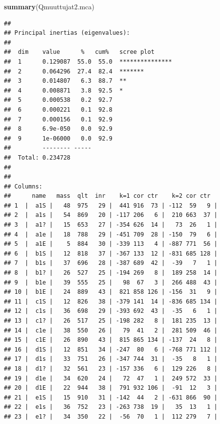 \documentclass[
  finnish,
]{book}
\newenvironment{Shaded}{\begin{snugshade}}{\end{snugshade}}
\newcommand{\KeywordTok}[1]{\textcolor[rgb]{0.13,0.29,0.53}{\textbf{#1}}}
\newcommand{\NormalTok}[1]{#1}
\begin{document}
\begin{Shaded}
\begin{Highlighting}[]
\KeywordTok{summary}\NormalTok{(Qmuuttujat2.mca)}
\end{Highlighting}
\end{Shaded}

\begin{verbatim}
## 
## Principal inertias (eigenvalues):
## 
##  dim    value      %   cum%   scree plot               
##  1      0.129087  55.0  55.0  ***************          
##  2      0.064296  27.4  82.4  *******                  
##  3      0.014807   6.3  88.7  **                       
##  4      0.008871   3.8  92.5  *                        
##  5      0.000538   0.2  92.7                           
##  6      0.000221   0.1  92.8                           
##  7      0.000156   0.1  92.9                           
##  8      6.9e-050   0.0  92.9                           
##  9      1e-06000   0.0  92.9                           
##         -------- -----                                 
##  Total: 0.234728                                       
## 
## 
## Columns:
##      name   mass  qlt  inr    k=1 cor ctr    k=2 cor ctr  
## 1  |  a1S |   48  975   29 |  441 916  73 | -112  59   9 |
## 2  |  a1s |   54  869   20 | -117 206   6 |  210 663  37 |
## 3  |  a1? |   15  653   27 | -354 626  14 |   73  26   1 |
## 4  |  a1e |   18  788   29 | -451 709  28 | -150  79   6 |
## 5  |  a1E |    5  884   30 | -339 113   4 | -887 771  56 |
## 6  |  b1S |   12  818   37 | -367 133  12 | -831 685 128 |
## 7  |  b1s |   37  696   28 | -387 689  42 |  -39   7   1 |
## 8  |  b1? |   26  527   25 | -194 269   8 |  189 258  14 |
## 9  |  b1e |   39  555   25 |   98  67   3 |  266 488  43 |
## 10 |  b1E |   24  889   43 |  821 858 126 | -156  31   9 |
## 11 |  c1S |   12  826   38 | -379 141  14 | -836 685 134 |
## 12 |  c1s |   36  698   29 | -393 692  43 |  -35   6   1 |
## 13 |  c1? |   26  517   25 | -198 282   8 |  181 235  13 |
## 14 |  c1e |   38  550   26 |   79  41   2 |  281 509  46 |
## 15 |  c1E |   26  890   43 |  815 865 134 | -137  24   8 |
## 16 |  d1S |   12  851   34 | -247  80   6 | -768 771 112 |
## 17 |  d1s |   33  751   26 | -347 744  31 |  -35   8   1 |
## 18 |  d1? |   32  561   23 | -157 336   6 |  129 226   8 |
## 19 |  d1e |   34  620   24 |   72  47   1 |  249 572  33 |
## 20 |  d1E |   22  944   38 |  791 932 106 |  -91  12   3 |
## 21 |  e1S |   15  910   31 | -142  44   2 | -631 866  90 |
## 22 |  e1s |   36  752   23 | -263 738  19 |   35  13   1 |
## 23 |  e1? |   34  350   22 |  -56  70   1 |  112 279   7 |

\end{verbatim}
\end{document}

